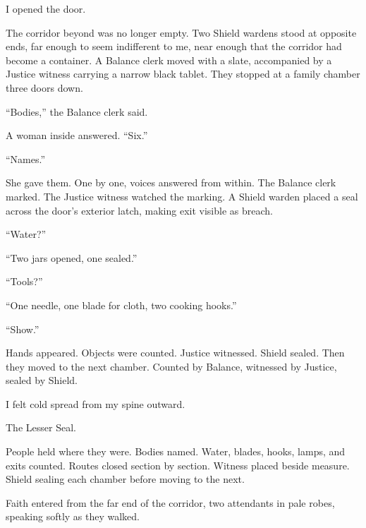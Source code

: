 I opened the door.\par

The corridor beyond was no longer empty. Two Shield wardens stood at opposite ends, far enough to seem indifferent to me, near enough that the corridor had become a container. A Balance clerk moved with a slate, accompanied by a Justice witness carrying a narrow black tablet. They stopped at a family chamber three doors down.\par

``Bodies,'' the Balance clerk said.\par

A woman inside answered. ``Six.''\par

``Names.''\par

She gave them. One by one, voices answered from within. The Balance clerk marked. The Justice witness watched the marking. A Shield warden placed a seal across the door's exterior latch, making exit visible as breach.\par

``Water?''\par

``Two jars opened, one sealed.''\par

``Tools?''\par

``One needle, one blade for cloth, two cooking hooks.''\par

``Show.''\par

Hands appeared. Objects were counted. Justice witnessed. Shield sealed. Then they moved to the next chamber. Counted by Balance, witnessed by Justice, sealed by Shield.\par

I felt cold spread from my spine outward.\par

The Lesser Seal.\par

People held where they were. Bodies named. Water, blades, hooks, lamps, and exits counted. Routes closed section by section. Witness placed beside measure. Shield sealing each chamber before moving to the next.\par

Faith entered from the far end of the corridor, two attendants in pale robes, speaking softly as they walked.\par

